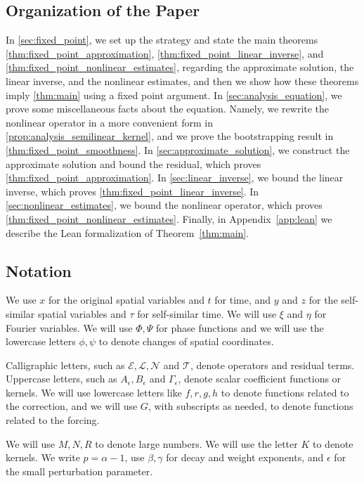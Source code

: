\documentclass[11pt]{amsart}
\theoremstyle{definition}
\theoremstyle{remark}
\numberwithin{equation}{section}
\newcommand{\mc}[1]{\mathcal{#1}}
\begin{document}
\subsection{Organization of the Paper} In \cref{sec:fixed_point}, we set up the strategy and state the main theorems \cref{thm:fixed_point_approximation}, \cref{thm:fixed_point_linear_inverse}, and \cref{thm:fixed_point_nonlinear_estimates}, regarding the approximate solution, the linear inverse, and the nonlinear estimates, and then we show how these theorems imply \cref{thm:main} using a fixed point argument. In \cref{sec:analysis_equation}, we prove some miscellaneous facts about the equation. Namely, we rewrite the nonlinear operator in a more convenient form in \cref{prop:analysis_semilinear_kernel}, and we prove the bootstrapping result in \cref{thm:fixed_point_smoothness}. In \cref{sec:approximate_solution}, we construct the approximate solution and bound the residual, which proves \cref{thm:fixed_point_approximation}. In \cref{sec:linear_inverse}, we bound the linear inverse, which proves \cref{thm:fixed_point_linear_inverse}. In \cref{sec:nonlinear_estimates}, we bound the nonlinear operator, which proves \cref{thm:fixed_point_nonlinear_estimates}. Finally, in Appendix~\ref{app:lean} we describe the Lean formalization of Theorem~\ref{thm:main}.

\subsection{Notation}
We use $x$ for the original spatial variables and $t$ for time, and $y$ and $z$ for the self-similar
spatial variables and $\tau$ for self-similar time. We will use $\xi$ and $\eta$ for Fourier
variables. We will use $\Phi, \Psi$ for phase functions and we will use the lowercase letters
$\phi,\psi$ to denote changes of spatial coordinates.

Calligraphic letters, such as $\mc{E},\mc{L},\mc{N}$ and $\mc{T}$, denote operators and residual terms. Uppercase
letters, such as $A_\epsilon,B_\epsilon$ and $\Gamma_\epsilon$, denote scalar coefficient functions or
kernels. We will use lowercase letters like $f, r, g, h$ to denote functions related to the
correction, and we will use $G$, with subscripts as needed, to denote functions related to the forcing.

We will use $M, N, R$ to denote large numbers. We will use the letter $K$ to denote kernels. We
write $p=\alpha-1$, use $\beta,\gamma$ for decay and weight exponents, and $\epsilon$ for the small
perturbation parameter.
\end{document}
